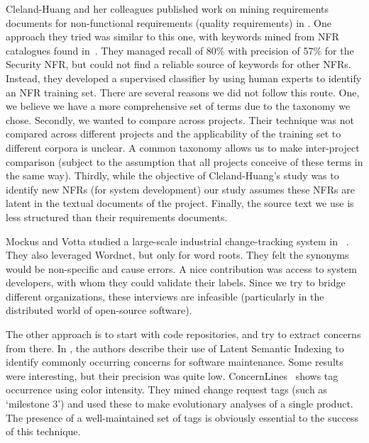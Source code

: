 \documentclass[10pt, conference, compsocconf]{IEEEtran}
\begin{document}
Cleland-Huang and her colleagues published work on mining requirements documents for non-functional requirements (quality requirements) in \cite{Cleland-Huang2006}. One approach they tried was similar to this one, with keywords mined from NFR catalogues found in~\cite{chung99}. They managed recall of 80\% with precision of 57\% for the Security NFR, but could not find a reliable source of keywords for other NFRs. Instead, they developed a supervised classifier by using human experts to identify an NFR training set. There are several reasons we did not follow this route. One, we believe we have a more comprehensive set of terms due to the taxonomy we chose. Secondly, we wanted to compare across projects. Their technique was not compared across different projects and the applicability of the training set to different corpora is unclear. A common taxonomy allows us to make inter-project comparison (subject to the assumption that all projects conceive of these terms in the same way). Thirdly, while the objective of Cleland-Huang's study was to identify new NFRs (for system development) our study assumes these NFRs are latent in the textual documents of the project. Finally, the source text we use is less structured than their requirements documents.

Mockus and Votta studied a large-scale industrial change-tracking system in ~\cite{Mockus00}. They also leveraged Wordnet, but only for word roots. They felt the synonyms would be non-specific and cause errors. A nice contribution was access to system developers, with whom they could validate their labels. Since we try to bridge different organizations, these interviews are infeasible (particularly in the distributed world of open-source software).

The other approach is to start with code repositories, and try to extract concerns from there. In \cite{marcus04wcre}, the authors describe their use of Latent Semantic Indexing to identify commonly occurring concerns for software maintenance. Some results were interesting, but their precision was quite low. ConcernLines~\cite{treude09cl} shows tag occurrence using color intensity. They mined change request tags (such as `milestone 3') and used these to make evolutionary analyses of a single product. The presence of a well-maintained set of tags is obviously essential to the success of this technique.
\end{document}
